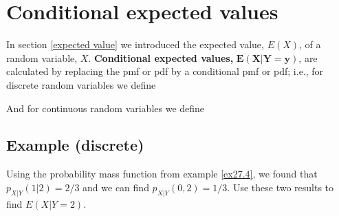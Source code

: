   	\bigskip
	
	\hfil{}
	\bigskip
	\bigskip
 
\section{Conditional expected values} \label{conditional expected value} \label{E(X|Y = y)}
In section \ref{expected value} we introduced the expected value, $E(X)$, of a random variable, $X$. \textbf{Conditional expected values,} $\boldsymbol{E(X|Y=y)}$, are calculated by replacing the pmf or pdf by a conditional pmf or pdf; i.e., for discrete random variables we define

  	\bigskip
	
	\hfil{}
	\bigskip
	\bigskip
 
\noindent And for continuous random variables we define

  	\bigskip
	
	\hfil{}
	\bigskip
	\bigskip
	
\subsection{Example (discrete)}
Using the probability mass function from example \ref{ex27.4}, we found that $p_{X|Y}(1|2) = 2/3$ and we can find $p_{X|Y}(0,2) = 1/3$. Use these two results to find $E(X|Y = 2)$. \\

